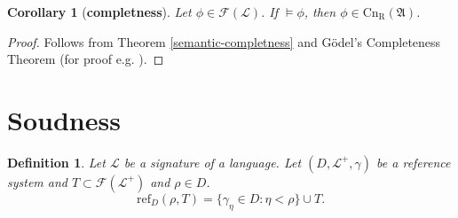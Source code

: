 \documentclass[10pt]{article}
\theoremstyle{plain}
\newtheorem{definition}[theorem]{Definition}
\newtheorem{corollary}[theorem]{Corollary}
\newcommand{\F}{\mathcal{F}}
\newcommand{\Cnr}{\text{Cn}_\text{R}}
\renewcommand{\L}{\mathscr{L}}
\newcommand{\refset}{\text{ref}}
\begin{document}
\begin{corollary}[\textbf{completness}]
Let $\phi\in\F(\L)$. If $\models \phi$, then $\phi\in\Cnr(\mathfrak{A})$.
\end{corollary}
\begin{proof}
Follows from Theorem \ref{semantic-completness} and Gödel’s Completeness Theorem (for proof e.g. \cite{prestel2011}).

\end{proof}

\section{Soudness}
\label{soudness}
\begin{definition}
Let $\L$ be a signature of a language.
Let $(D, \L^+,\gamma)$ be a reference system and $T\subset \F(\L^+)$ and $\rho\in D$.
\begin{equation}
\refset_D(\rho, T) = \{\gamma_\eta\in D: \eta < \rho\}\cup T.
\end{equation}
\end{definition}
\end{document}
